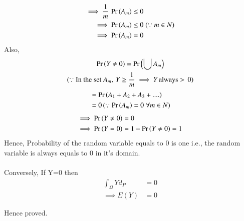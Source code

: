 \documentclass[journal,12pt,twocolumn]{IEEEtran}
\begin{document}
\begin{align}
    \implies \frac{1}{m}\,\Pr\left(A_m\right) &\leq 0\\
    \implies \Pr\left(A_m\right) &\leq 0\;(\because m \in N)\\
    \implies \Pr\left(A_m\right) &= 0
\end{align}
Also,
\begin{multline}
    \Pr\left(Y \neq 0\right) = \Pr\left(\bigcup A_m\right)\\(\because \text{In the set } A_m,\,Y \geq \frac{1}{m} \implies Y\,\text{always}> \,0)
\end{multline}
\begin{align}
    &= \Pr\left(A_1 + A_2 + A_3 + ....\right)\\
    &= 0\,(\because \Pr\left(A_m\right) = 0\;\forall m \in N)
\end{align}
\begin{align}
  \implies \Pr\left(Y \neq 0\right) &= 0\\
  \implies \Pr\left(Y =0\right) &= 1- \Pr\left(Y \neq 0\right) = 1
\end{align}
Hence, Probability of the random variable equals to 0 is one i.e., the random variable is always equals to 0 in it's domain.\\\\
Conversely, If Y=0 then
\begin{align}
    \int_\Omega Yd_P &=0\\ 
    \implies E(Y) &=0 
\end{align}

Hence proved.
\end{document}
